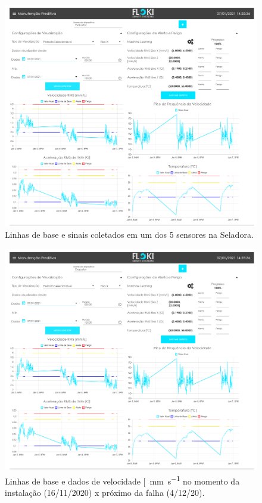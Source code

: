 \begin{figure}[H]
    \caption{Linhas de base e sinais coletados em um dos 5 sensores na Seladora.}
    \begin{center}
        \includegraphics[scale=0.95, page=4]{resultados/img/resultados.pdf}
    \end{center}
    \label{fig:seladora}
\end{figure}



\begin{figure}[H]
    \caption{Linhas de base e dados de velocidade [\SI{}{\milli\metre\per\second} no momento da instalação
    (16/11/2020) x próximo da falha (4/12/20).}
    \begin{center}
        \includegraphics[scale=0.55, page=5]{resultados/img/resultados.pdf}
    \end{center}
    \label{fig:seladora_antes_depois}
\end{figure}


